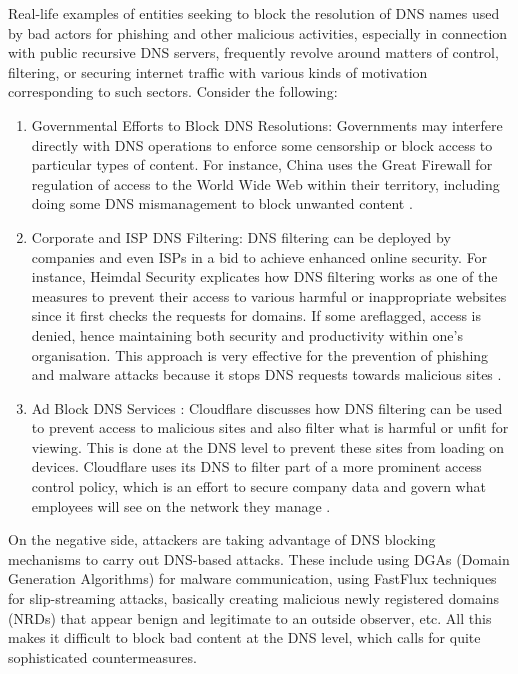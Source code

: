 Real-life examples of entities seeking to block the resolution of DNS names used by bad actors for phishing and other malicious activities, especially in connection with public recursive DNS servers, frequently revolve around matters of control, filtering, or securing internet traffic with various kinds of motivation corresponding to such sectors. Consider the following:

\begin{enumerate}
    \item Governmental Efforts to Block DNS Resolutions: Governments may interfere directly with DNS operations to enforce some censorship or block access to particular types of content. For instance, China uses the Great Firewall for regulation of access to the World Wide Web within their territory, including doing some DNS mismanagement to block unwanted content \cite{XuAlbert2017MediaCensorship}.
    \item Corporate and ISP DNS Filtering: DNS filtering can be deployed by companies and even ISPs in a bid to achieve enhanced online security. For instance, Heimdal Security explicates how DNS filtering works as one of the measures to prevent their access to various harmful or inappropriate websites since it first checks the requests for domains. If some areflagged, access is denied, hence maintaining both security and productivity within one's organisation. This approach is very effective for the prevention of phishing and malware attacks because it stops DNS requests towards malicious sites \cite{
HeimdalDNSSecurity2023}.
    \item Ad Block DNS Services : Cloudflare discusses how DNS filtering can be used to prevent access to malicious sites and also filter what is harmful or unfit for viewing. This is done at the DNS level to prevent these sites from loading on devices. Cloudflare uses its DNS to filter part of a more prominent access control policy, which is an effort to secure company data and govern what employees will see on the network they manage \cite{CloudflareDNSFiltering2023}.   
\end{enumerate}

 On the negative side, attackers are taking advantage of DNS blocking mechanisms to carry out DNS-based attacks. These include using DGAs (Domain Generation Algorithms) for malware communication, using FastFlux techniques for slip-streaming attacks, basically creating malicious newly registered domains (NRDs) that appear benign and legitimate to an outside observer, etc. All this makes it difficult to block bad content at the DNS level, which calls for quite sophisticated countermeasures.



